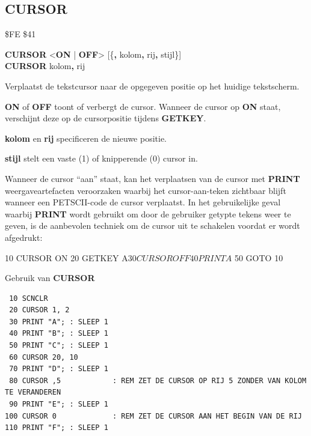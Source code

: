 
\newpage
\subsection{CURSOR}
\begin{description}[leftmargin=2cm,style=nextline]
\item [Token:]   \$FE \$41

\item [Formaat:]  {\bf CURSOR} <{\bf ON} | {\bf OFF}> [\{{\bf,} kolom{\bf,} rij{\bf,} stijl\}] \\                {\bf CURSOR} kolom{\bf,} rij{\bf}

\item [Gebruik:]   Verplaatst de tekstcursor naar de opgegeven positie op het huidige tekstscherm.

                 {\bf ON} of {\bf OFF} toont of verbergt de cursor. Wanneer de cursor op {\bf ON} staat, verschijnt deze op de cursorpositie tijdens {\bf GETKEY}.

                 {\bf kolom} en {\bf rij} specificeren de nieuwe positie.

                 {\bf stijl} stelt een vaste (1) of knipperende (0) cursor in.

\item [Opmerkingen:] Wanneer de cursor ``aan'' staat, kan het verplaatsen van de cursor met {\bf PRINT} weergaveartefacten veroorzaken waarbij het cursor-aan-teken zichtbaar blijft wanneer een PETSCII-code de cursor verplaatst. In het gebruikelijke geval waarbij {\bf PRINT} wordt gebruikt om door de gebruiker getypte tekens weer te geven, is de aanbevolen techniek om de cursor uit te schakelen voordat er wordt afgedrukt:

\begin{basiccode}
 10 CURSOR ON
 20 GETKEY A$
 30 CURSOR OFF
 40 PRINT A$
 50 GOTO 10
\end{basiccode}

\item [Voorbeeld:] Gebruik van {\bf CURSOR}
\begin{tcolorbox}[colback=black,coltext=white]
\verbatimfont{\codefont}
\begin{verbatim}
 10 SCNCLR
 20 CURSOR 1, 2
 30 PRINT "A"; : SLEEP 1
 40 PRINT "B"; : SLEEP 1
 50 PRINT "C"; : SLEEP 1
 60 CURSOR 20, 10
 70 PRINT "D"; : SLEEP 1
 80 CURSOR ,5            : REM ZET DE CURSOR OP RIJ 5 ZONDER VAN KOLOM TE VERANDEREN
 90 PRINT "E"; : SLEEP 1
100 CURSOR 0             : REM ZET DE CURSOR AAN HET BEGIN VAN DE RIJ
110 PRINT "F"; : SLEEP 1
\end{verbatim}
\end{tcolorbox}
\end{description}

